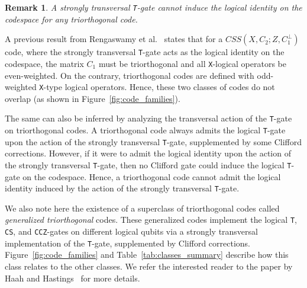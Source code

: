 \documentclass[journal]{IEEEtran}
\newcommand{\T}{\texttt{T}}
\newcommand{\X}{\texttt{X}}
\newcommand{\CS}{\texttt{CS}}
\newcommand{\CCZ}{\texttt{CCZ}}
\newtheorem{remark}{Remark}[theorem]
\begin{document}
\begin{remark}
    A strongly transversal \T-gate cannot induce the logical identity on the codespace for any triorthogonal code.
\end{remark}
A previous result from Rengaswamy et al.~\cite{rengaswamy_optimality_2020} states that for a $CSS(X,C_2;Z,C_1^\perp)$ code, where the strongly transversal \T-gate acts as the logical identity on the codespace, the matrix $C_1$ must be triorthogonal and all \X-logical operators be even-weighted. On the contrary, triorthogonal codes are defined with odd-weighted \X-type logical operators. Hence, these two classes of codes do not overlap (as shown in Figure~\ref{fig:code_families}). 

The same can also be inferred by analyzing the transversal action of the \T-gate on triorthogonal codes. A triorthogonal code always admits the logical \T-gate upon the action of the strongly transversal \T-gate, supplemented by some Clifford corrections. However, if it were to admit the logical identity upon the action of the strongly transversal \T-gate, then no Clifford gate could induce the logical \T-gate on the codespace. Hence, a triorthogonal code cannot admit the logical identity induced by the action of the strongly transversal \T-gate.


We also note here the existence of a superclass of triorthogonal codes called \textit{generalized triorthogonal} codes. These generalized codes implement the logical \T, \CS, and \CCZ-gates on different logical qubits via a strongly transversal implementation of the \T-gate, supplemented by Clifford corrections. Figure~\ref{fig:code_families} and Table~\ref{tab:classes_summary} describe how this class relates to the other classes. We refer the interested reader to the paper by Haah and Hastings~\cite{haah_codes_2018} for more details.
\end{document}
